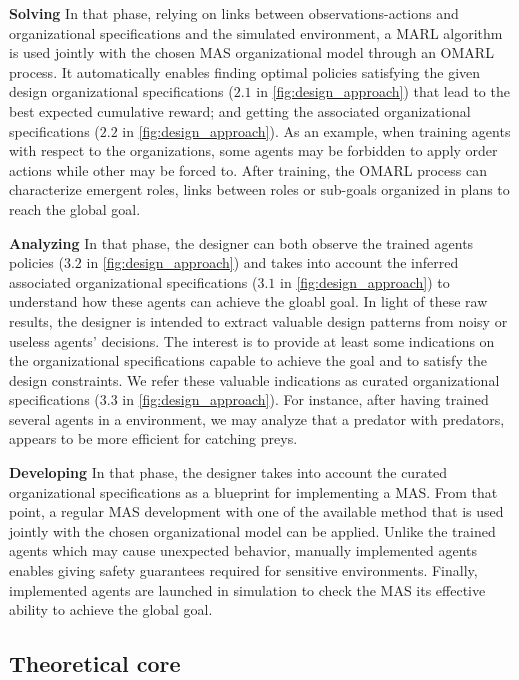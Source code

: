 \documentclass[runningheads]{llncs}
\begin{document}
\textbf{Solving} \quad In that phase, relying on links between observations-actions and organizational specifications and the simulated environment, a MARL algorithm is used jointly with the chosen MAS organizational model through an OMARL process. It automatically enables finding optimal policies satisfying the given design organizational specifications ($2.1$ in \autoref{fig:design_approach}) that lead to the best expected cumulative reward; and getting the associated organizational specifications ($2.2$ in \autoref{fig:design_approach}). As an example, when training agents with respect to the  organizations, some agents may be forbidden to apply order actions while other may be forced to. After training, the OMARL process can characterize emergent roles, links between roles or sub-goals organized in plans to reach the global goal.

\textbf{Analyzing} \quad In that phase, the designer can both observe the trained agents policies ($3.2$ in \autoref{fig:design_approach}) and takes into account the inferred associated organizational specifications ($3.1$ in \autoref{fig:design_approach}) to understand how these agents can achieve the gloabl goal. In light of these raw results, the designer is intended to extract valuable design patterns from noisy or useless agents' decisions. The interest is to provide at least some indications on the organizational specifications capable to achieve the goal and to satisfy the design constraints. We refer these valuable indications as curated organizational specifications ($3.3$ in \autoref{fig:design_approach}). For instance, after having trained several agents in a  environment, we may analyze that a  predator with  predators, appears to be more efficient for catching preys.

\textbf{Developing} \quad In that phase, the designer takes into account the curated organizational specifications as a blueprint for implementing a MAS. From that point, a regular MAS development with one of the available method that is used jointly with the chosen organizational model can be applied. Unlike the trained agents which may cause unexpected behavior, manually implemented agents enables giving safety guarantees required for sensitive environments. Finally, implemented agents are launched in simulation to check the MAS its effective ability to achieve the global goal.


\subsection{Theoretical core}
\end{document}

